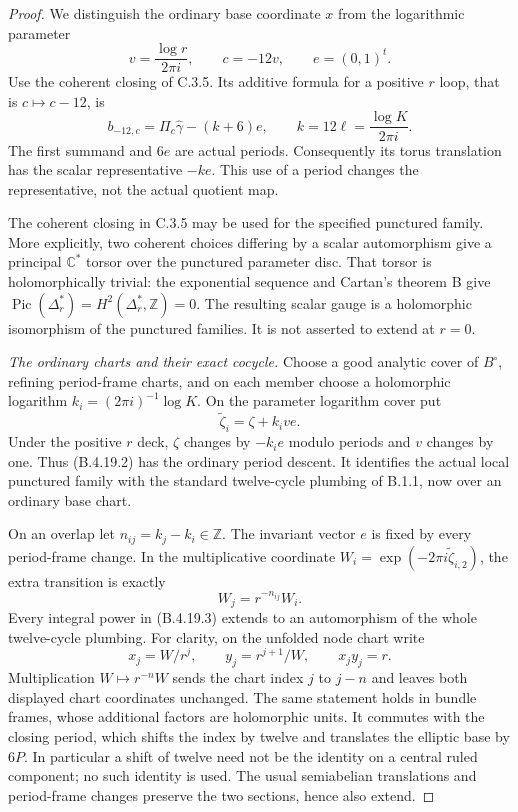 \begin{proof}
We distinguish the ordinary base coordinate $x$ from
the logarithmic parameter
\[
 v=\frac{\log r}{2\pi i},\qquad c=-12v,
 \qquad e=(0,1)^t.
\]
Use the coherent closing of C.3.5. Its additive formula
for a positive $r$ loop, that is $c\mapsto c-12$, is
\[
 b_{-12,c}=\Pi_c\widehat\gamma-(k+6)e,
 \qquad k=12\ell=\frac{\log K}{2\pi i}.
 \tag{B.4.19.1}
\]
The first summand and $6e$ are actual periods.
Consequently its torus translation has the scalar
representative $-ke$. This use of a period changes
the representative, not the actual quotient map.

The coherent closing in C.3.5 may be used for the
specified punctured family. More explicitly, two
coherent choices differing by a scalar automorphism
give a principal $\mathbb C^*$ torsor over the punctured
parameter disc. That torsor is holomorphically trivial:
the exponential sequence and Cartan's theorem B give
$\operatorname{Pic}(\Delta_r^*)=H^2(\Delta_r^*,\mathbb Z)=0$.
The resulting scalar gauge is a holomorphic
isomorphism of the punctured families. It is not
asserted to extend at $r=0$.

\emph{The ordinary charts and their exact cocycle.}
Choose a good analytic cover of $B^\circ$, refining
period-frame charts, and on each member choose a
holomorphic logarithm $k_i=(2\pi i)^{-1}\log K$.
On the parameter logarithm cover put
\[
 \widetilde\zeta_i=\zeta+k_i v e.
 \tag{B.4.19.2}
\]
Under the positive $r$ deck, $\zeta$ changes by
$-k_i e$ modulo periods and $v$ changes by one.
Thus (B.4.19.2) has the ordinary period descent.
It identifies the actual local punctured family
with the standard twelve-cycle plumbing of B.1.1,
now over an ordinary base chart.

On an overlap let $n_{ij}=k_j-k_i\in\mathbb Z$.
The invariant vector $e$ is fixed by every period-frame
change. In the multiplicative coordinate
$W_i=\exp(-2\pi i\widetilde\zeta_{i,2})$, the extra
transition is exactly
\[
 W_j=r^{-n_{ij}}W_i.
 \tag{B.4.19.3}
\]
Every integral power in (B.4.19.3) extends to an
automorphism of the whole twelve-cycle plumbing.
For clarity, on the unfolded node chart write
\[
 x_j=W/r^j,\qquad y_j=r^{j+1}/W,
 \qquad x_jy_j=r.
\]
Multiplication $W\mapsto r^{-n}W$ sends the chart
index $j$ to $j-n$ and leaves both displayed chart
coordinates unchanged. The same statement holds
in bundle frames, whose additional factors are
holomorphic units. It commutes with the closing
period, which shifts the index by twelve and
translates the elliptic base by $6P$. In particular
a shift of twelve need not be the identity on a
central ruled component; no such identity is used.
The usual semiabelian translations and period-frame
changes preserve the two sections, hence also extend.


\end{proof}
